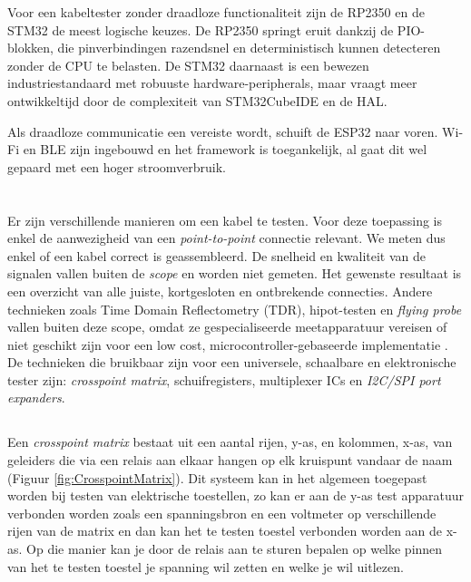 Voor een kabeltester zonder draadloze functionaliteit zijn de RP2350 en de STM32 de meest logische keuzes. De RP2350 springt eruit dankzij de PIO-blokken, die pinverbindingen razendsnel en deterministisch kunnen detecteren zonder de CPU te belasten. De STM32 daarnaast is een bewezen industriestandaard met robuuste hardware-peripherals, maar vraagt meer ontwikkeltijd door de complexiteit van STM32CubeIDE en de \gls{HAL}.

Als draadloze communicatie een vereiste wordt, schuift de ESP32 naar voren. Wi-Fi en BLE zijn ingebouwd en het framework is toegankelijk, al gaat dit wel gepaard met een hoger stroomverbruik. 


\section{}%
\label{sec:kabeltesters}

Er zijn verschillende manieren om een kabel te testen. Voor deze toepassing is enkel de aanwezigheid van een \textit{point-to-point} connectie relevant. We meten dus enkel of een kabel correct is geassembleerd. De snelheid en kwaliteit van de signalen vallen buiten de \textit{scope} en worden niet gemeten. Het gewenste resultaat is een overzicht van alle juiste, kortgesloten en ontbrekende connecties. Andere technieken zoals Time Domain Reflectometry (TDR), hipot-testen en \textit{flying probe} vallen buiten deze scope, omdat ze gespecialiseerde meetapparatuur vereisen of niet geschikt zijn voor een low cost, microcontroller-gebaseerde implementatie \autocite{Khouri2021} \autocite{Bi2018}. De technieken die bruikbaar zijn voor een universele, schaalbare en elektronische tester zijn: \textit{crosspoint matrix}, schuifregisters, multiplexer ICs en \textit{\gls{I2C}/\gls{SPI} port expanders}.

\subsection{} 
\label{ssec:crosspointmatrix}

Een \textit{crosspoint matrix} bestaat uit een aantal rijen, y-as, en kolommen, x-as, van geleiders die via een relais aan elkaar hangen op elk kruispunt vandaar de naam (Figuur \ref{fig:CrosspointMatrix})\autocite{Stasonis2026}. Dit systeem kan in het algemeen toegepast worden bij testen van elektrische toestellen, zo kan er aan de y-as test apparatuur verbonden worden zoals een spanningsbron en een voltmeter op verschillende rijen van de matrix en dan kan het te testen toestel verbonden worden aan de x-as. Op die manier kan je door de relais aan te sturen bepalen op welke pinnen van het te testen toestel je spanning wil zetten en welke je wil uitlezen. 

